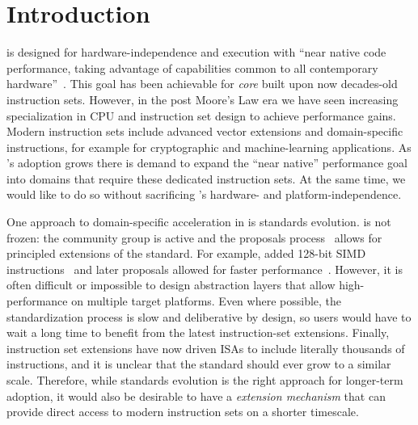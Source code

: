 \section{Introduction}


\wasm is designed for hardware-independence and execution with ``near native
code performance, taking advantage of capabilities common to all contemporary
hardware''~\cite{wasm-spec-core}. This goal has been achievable for \emph{core}
\wasm built upon now decades-old instruction sets. However, in the post Moore's
Law era we have seen increasing specialization in CPU and instruction set design
to achieve performance gains. Modern instruction sets include advanced vector
extensions and domain-specific instructions, for example for cryptographic and
machine-learning applications. As \wasm's adoption grows there is demand to
expand the ``near native'' performance goal into domains that require these
dedicated instruction sets.  At the same time, we would like to do so without
sacrificing \wasm's hardware- and platform-independence.


One approach to domain-specific acceleration in \wasm is standards evolution.
\wasm is not frozen: the community group is active and the proposals
process~\cite{wasm-proposals} allows for principled extensions of the standard.
For example,  added 128-bit SIMD instructions~\cite{wasm-simd} and
later proposals allowed for faster performance~\cite{wasm-relaxed-simd}.
However, it is often difficult or impossible to design abstraction layers that
allow high-performance on multiple target platforms. Even where possible, the
standardization process is slow and deliberative by design, so \wasm users would
have to wait a long time to benefit from the latest instruction-set extensions.
Finally, instruction set extensions have now driven ISAs to include literally
thousands of instructions, and it is unclear that the \wasm standard should ever
grow to a similar scale. Therefore, while standards evolution is the right
approach for longer-term adoption, it would also be desirable to have a
\emph{\wasml extension mechanism} that can provide direct access to modern
instruction sets on a shorter timescale.


